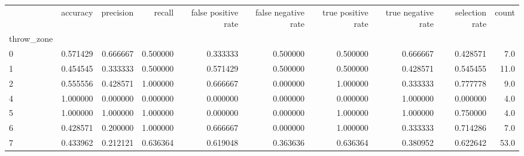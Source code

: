 \begin{tabular}{lrrrrrrrrr}
\toprule
{} &  accuracy &  precision &    recall &  false positive rate &  false negative rate &  true positive rate &  true negative rate &  selection rate &  count \\
throw\_zone &           &            &           &                      &                      &                     &                     &                 &        \\
\midrule
0          &  0.571429 &   0.666667 &  0.500000 &             0.333333 &             0.500000 &            0.500000 &            0.666667 &        0.428571 &    7.0 \\
1          &  0.454545 &   0.333333 &  0.500000 &             0.571429 &             0.500000 &            0.500000 &            0.428571 &        0.545455 &   11.0 \\
2          &  0.555556 &   0.428571 &  1.000000 &             0.666667 &             0.000000 &            1.000000 &            0.333333 &        0.777778 &    9.0 \\
4          &  1.000000 &   0.000000 &  0.000000 &             0.000000 &             0.000000 &            0.000000 &            1.000000 &        0.000000 &    4.0 \\
5          &  1.000000 &   1.000000 &  1.000000 &             0.000000 &             0.000000 &            1.000000 &            1.000000 &        0.750000 &    4.0 \\
6          &  0.428571 &   0.200000 &  1.000000 &             0.666667 &             0.000000 &            1.000000 &            0.333333 &        0.714286 &    7.0 \\
7          &  0.433962 &   0.212121 &  0.636364 &             0.619048 &             0.363636 &            0.636364 &            0.380952 &        0.622642 &   53.0 \\
\bottomrule
\end{tabular}
